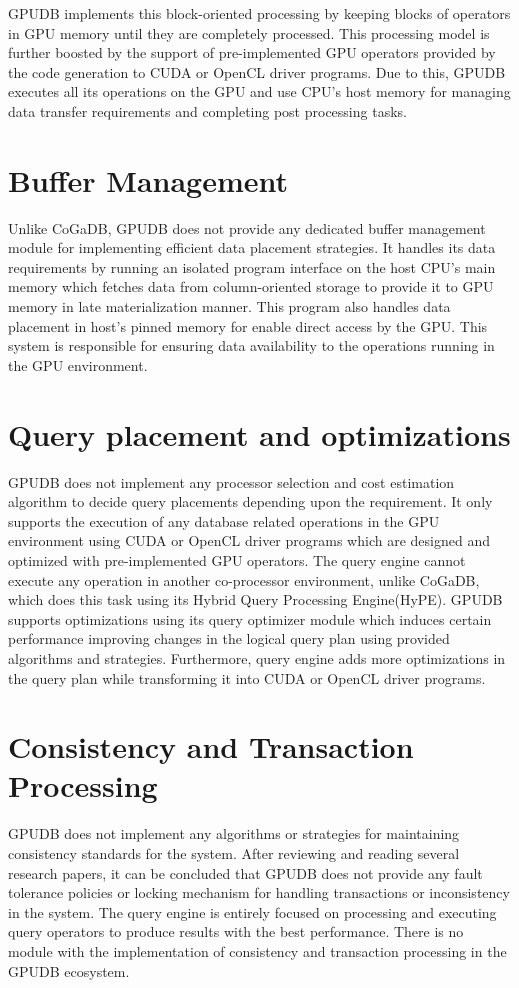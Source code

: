 GPUDB implements this block-oriented processing by keeping blocks of operators in GPU memory until they are completely processed. This processing model is further boosted by the support of pre-implemented GPU operators provided by the code generation to CUDA or OpenCL driver programs. Due to this, GPUDB executes all its operations on the GPU and use CPU's host memory for managing data transfer requirements and completing post processing tasks.

\section*{Buffer Management}
Unlike CoGaDB, GPUDB does not provide any dedicated buffer management module for implementing efficient data placement strategies. It handles its data requirements by running an isolated program interface on the host CPU's main memory which fetches data from column-oriented storage to provide it to GPU memory in late materialization manner. This program also handles data placement in host's pinned memory for enable direct access by the GPU. This system is responsible for ensuring data availability to the operations running in the GPU environment.

\section*{Query placement and optimizations}
GPUDB does not implement any processor selection and cost estimation algorithm to decide query placements depending upon the requirement. It only supports the execution of any database related operations in the GPU environment using CUDA or OpenCL driver programs which are designed and optimized with pre-implemented GPU operators. The query engine cannot execute any operation in another co-processor environment, unlike CoGaDB, which does this task using its Hybrid Query Processing Engine(HyPE).
GPUDB supports optimizations using its query optimizer module which induces certain performance improving changes in the logical query plan using provided algorithms and strategies. Furthermore, query engine adds more optimizations in the query plan while transforming it into CUDA or OpenCL driver programs.

\section*{Consistency and Transaction Processing}
GPUDB does not implement any algorithms or strategies for maintaining consistency standards for the system. After reviewing and reading several research papers, it can be concluded that GPUDB does not provide any fault tolerance policies or locking mechanism for handling transactions or inconsistency in the system. The query engine is entirely focused on processing and executing query operators to produce results with the best performance. There is no module with the implementation of consistency and transaction processing in the GPUDB ecosystem.

